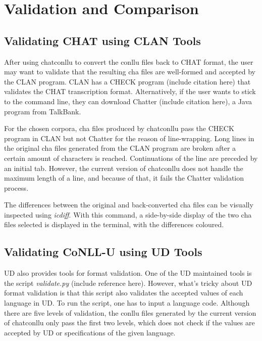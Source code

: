 \chapter{Validation and Comparison} %

\label{Chapter5} %

\section{Validating CHAT using CLAN Tools}

After using chatconllu to convert the conllu files back to CHAT format, the user may want to validate that the resulting cha files are well-formed and accepted by the CLAN program. CLAN has a CHECK program (include citation here) that validates the CHAT transcription format. Alternatively, if the user wants to stick to the command line, they can download Chatter (include citation here), a Java program from TalkBank.


For the chosen corpora, cha files produced by chatconllu pass the CHECK program in CLAN but not Chatter for the reason of line-wrapping. Long lines in the original cha files generated from the CLAN program are broken after a certain amount of characters is reached. Continuations of the line are preceded by an initial tab. However, the current version of chatconllu does not handle the maximum length of a line, and because of that, it fails the Chatter validation process.

The differences between the original and back-converted cha files can be visually inspected using \emph{icdiff}. With this command, a side-by-side display of the two cha files selected is displayed in the terminal, with the differences coloured.

\section{Validating CoNLL-U using UD Tools}

UD also provides tools for format validation. One of the UD maintained tools is the script \emph{validate.py} (include reference here). However, what's tricky about UD format validation is that this script also validates the accepted values of each language in UD. To run the script, one has to input a language code. Although there are five levels of validation, the conllu files generated by the current version of chatconllu only pass the first two levels, which does not check if the values are accepted by UD or specifications of the given language.
